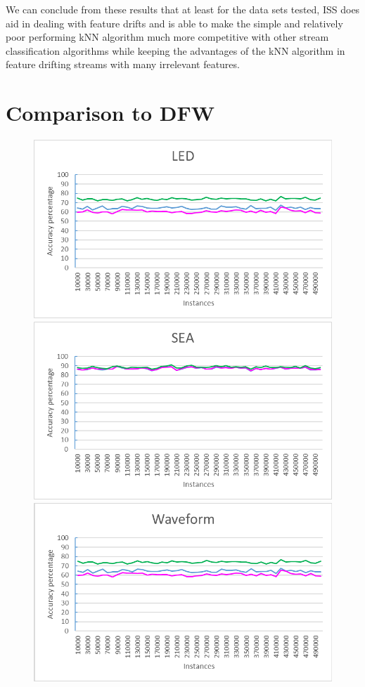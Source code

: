 We can conclude from these results that at least for the data sets tested, ISS  does aid in dealing with feature drifts and is able to make the simple and relatively poor performing kNN algorithm much more competitive with other stream classification algorithms while keeping the advantages of the kNN algorithm in feature drifting streams with many irrelevant features.

\section{Comparison to DFW}
\begin{figure}[h]
\centering 
\includegraphics[scale=0.17]{Graphs/LED/vsDFW}
\includegraphics[scale=0.17]{Graphs/SEA/vsDFW}
\includegraphics[scale=0.17]{Graphs/Waveform/vsDFW}

\end{figure}
